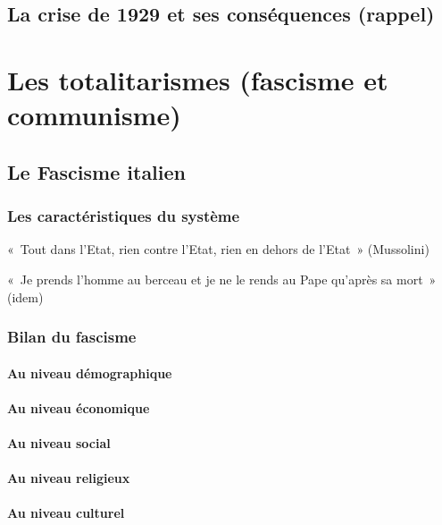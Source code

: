 \documentclass[12pt]{report}
\begin{document}
\section{La crise de 1929 et ses conséquences (rappel)}

\chapter{Les totalitarismes (fascisme et communisme)}

\section{Le Fascisme italien}

\subsection{Les caractéristiques du système}

«~Tout dans l’Etat, rien contre l’Etat, rien en dehors de l’Etat~» (Mussolini)

«~Je prends l’homme au berceau et je ne le rends au Pape qu’après sa mort~» (idem)

\subsection{Bilan du fascisme}

\subsubsection{Au niveau démographique}

\subsubsection{Au niveau économique}

\subsubsection{Au niveau social}

\subsubsection{Au niveau religieux}

\subsubsection{Au niveau culturel}
\end{document}
